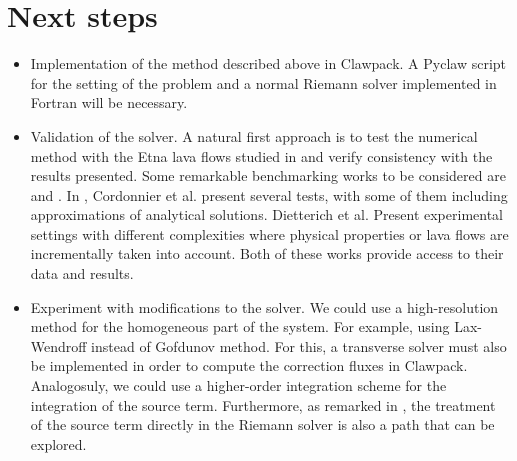 \documentclass[12pt]{article}
\begin{document}
\section{Next steps}
\begin{itemize}
    \item Implementation of the method described above in Clawpack. 
        A Pyclaw script for the setting of the problem and a normal Riemann solver implemented in Fortran will be necessary.
    \item Validation of the solver. A natural first approach is to test the numerical method with the Etna lava flows studied in \cite{costa2005numerical} and verify consistency with the results presented.
        Some remarkable benchmarking works to be considered are \cite{cordonnier2016benchmarking} and \cite{dietterich2017benchmarking}. 
        In \cite{cordonnier2016benchmarking}, Cordonnier et al. present several tests, with some of them including approximations of analytical solutions.
        Dietterich et al. Present experimental settings with different complexities where physical properties or lava flows are incrementally taken into account. 
        Both of these works provide access to their data and results.
    \item Experiment with modifications to the solver.
        We could use a high-resolution method for the homogeneous part of the system.
        For example, using Lax-Wendroff instead of Gofdunov method. 
        For this, a transverse solver must also be implemented in order to compute the correction fluxes in Clawpack.
        Analogosuly, we could use a higher-order integration scheme for the integration of the source term.
        Furthermore, as remarked in \cite{costa2005numerical}, the treatment of the source term directly in the Riemann solver is also a path that can be explored.

\end{itemize}


\end{document}
